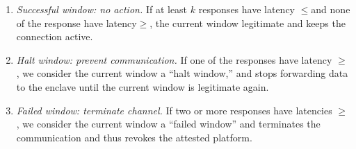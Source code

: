 \begin{enumerate}
  \item \emph{Successful window: no action.} If at least $k$ responses have latency $\leq$\connect and none of the response have latency$\geq$\detach, the current window legitimate and \device keeps the connection active.
 
  \item \emph{Halt window: prevent communication.} If one of the responses have latency $\geq$\detach, we consider the current window a ``halt window,'' and \device stops forwarding data to the enclave until the current window is legitimate again.

  \item \emph{Failed window: terminate channel.} If two or more responses have latencies $\geq$\detach, we consider the current window a ``failed window'' and \device terminates the communication and thus revokes the attested platform.
\end{enumerate}






